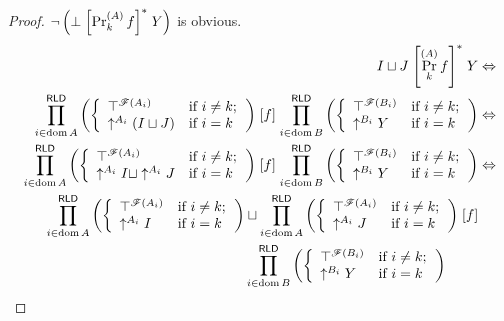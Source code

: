 \begin{proof}
$\neg\left(\bot\mathrel{\left[\Pr_{k}^{(A)}f\right]^{\ast}}Y\right)$ is obvious.
\begin{align*}
I\sqcup J\rsuprel{\Pr_{k}^{(A)}f}Y & \Leftrightarrow\\
\prod_{i\in\dom A}^{\mathsf{RLD}}\left(\left\{ \begin{array}{ll}
\top^{\mathscr{F}(A_{i})} & \text{if }i\neq k;\\
\uparrow^{A_{i}}(I\sqcup J) & \text{if }i=k
\end{array}\right.\right)\suprel f\prod_{i\in\dom B}^{\mathsf{RLD}}\left(\left\{ \begin{array}{ll}
\top^{\mathscr{F}(B_{i})} & \text{if }i\neq k;\\
\uparrow^{B_{i}}Y & \text{if }i=k
\end{array}\right.\right) & \Leftrightarrow\\
\prod_{i\in\dom A}^{\mathsf{RLD}}\left(\left\{ \begin{array}{ll}
\top^{\mathscr{F}(A_{i})} & \text{if }i\neq k;\\
\uparrow^{A_{i}}I\sqcup\uparrow^{A_{i}}J & \text{if }i=k
\end{array}\right.\right)\suprel f\prod_{i\in\dom B}^{\mathsf{RLD}}\left(\left\{ \begin{array}{ll}
\top^{\mathscr{F}(B_{i})} & \text{if }i\neq k;\\
\uparrow^{B_{i}}Y & \text{if }i=k
\end{array}\right.\right) & \Leftrightarrow\\
\begin{aligned}\prod_{i\in\dom A}^{\mathsf{RLD}}\left(\left\{ \begin{array}{ll}
\top^{\mathscr{F}(A_{i})} & \text{if }i\neq k;\\
\uparrow^{A_{i}}I & \text{if }i=k
\end{array}\right.\right) & \sqcup\prod_{i\in\dom A}^{\mathsf{RLD}}\left(\left\{ \begin{array}{ll}
\top^{\mathscr{F}(A_{i})} & \text{if }i\neq k;\\
\uparrow^{A_{i}}J & \text{if }i=k
\end{array}\right.\right)\suprel f\\
 & \prod_{i\in\dom B}^{\mathsf{RLD}}\left(\left\{ \begin{array}{ll}
\top^{\mathscr{F}(B_{i})} & \text{if }i\neq k;\\
\uparrow^{B_{i}}Y & \text{if }i=k
\end{array}\right.\right)

\end{aligned}
\end{align*}
\end{proof}
